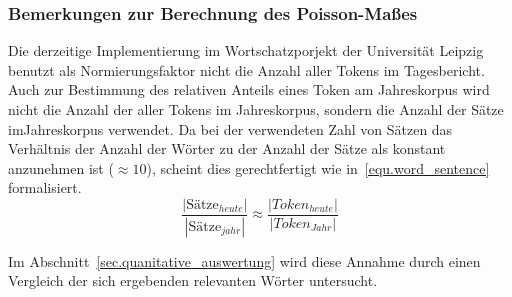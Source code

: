 \subsubsection{Bemerkungen zur Berechnung des Poisson-Maßes}
Die derzeitige Implementierung im Wortschatzporjekt der Universität Leipzig benutzt als Normierungsfaktor nicht die Anzahl aller Tokens im Tagesbericht. Auch zur Bestimmung des relativen Anteils eines Token am Jahreskorpus wird nicht die Anzahl der aller Tokens im Jahreskorpus, sondern die Anzahl der Sätze imJahreskorpus verwendet. Da bei der verwendeten Zahl von Sätzen das Verhältnis der Anzahl der Wörter zu der Anzahl der Sätze als konstant anzunehmen ist ($\approx 10$), scheint dies gerechtfertigt wie in~\ref{equ.word_sentence} formalisiert. 
\begin{equation}\label{equ.word_sentence}
\frac{|\text{Sätze}_{heute}|}{|\text{Sätze}_{jahr}|} \approx \frac{|Token_{heute}|}{|Token_{Jahr}|}
\end{equation}

Im Abschnitt~\ref{sec.quanitative_auswertung} wird diese Annahme durch einen Vergleich der sich ergebenden relevanten Wörter untersucht.

